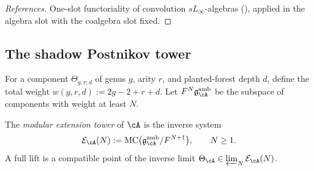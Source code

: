 \begin{proof}[References]
One-slot functoriality of convolution $sL_\infty$-algebras
(\cite[Theorem~5.1]{RNW19}), applied in the algebra slot with the
coalgebra slot fixed.
\end{proof}

\subsection{The shadow Postnikov tower}
\label{subsec:shadow-postnikov-tower}

\begin{definition}
\label{def:weight-filtration-tower}
For a component $\Theta_{g,r;d}$ of genus $g$, arity $r$, and
planted-forest depth $d$, define the total weight
$w(g,r,d) := 2g - 2 + r + d$.
Let $F^N\mathfrak{g}^{\mathrm{amb}}_{\cA}$ be the subspace of
components with weight at least $N$.
\end{definition}

\begin{definition}
\label{def:extension-tower}
The \emph{modular extension tower} of $\cA$ is the inverse system
\begin{equation}
\label{eq:extension-tower}
\mathcal{E}_{\cA}(N)
:=
\operatorname{MC}\bigl(
\mathfrak{g}^{\mathrm{amb}}_{\cA}/F^{N+1}
\bigr),
\qquad N \geq 1.
\end{equation}
A full lift is a compatible point of the inverse limit
$\Theta_{\cA} \in \varprojlim_N \mathcal{E}_{\cA}(N)$.
\end{definition}

